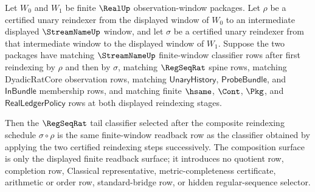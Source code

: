\begin{theorem}
\label{thm:regseqrat-tail-classifier-reindexing-composition}
Let $W_0$ and $W_1$ be finite $\RealUp$ observation-window packages. Let
$\rho$ be a certified unary reindexer from the displayed window of $W_0$ to an
intermediate displayed $\StreamNameUp$ window, and let $\sigma$ be a certified
unary reindexer from that intermediate window to the displayed window of
$W_1$. Suppose the two packages have matching $\StreamNameUp$ finite-window
classifier rows after first reindexing by $\rho$ and then by $\sigma$, matching
$\RegSeqRat$ spine rows, matching DyadicRatCore observation rows, matching
$\mathsf{UnaryHistory}$, $\mathsf{ProbeBundle}$, and $\mathsf{InBundle}$
membership rows, and matching finite $\hsame$, $\Cont$, $\Pkg$, and
$\mathsf{RealLedgerPolicy}$ rows at both displayed reindexing stages.

Then the $\RegSeqRat$ tail classifier selected after the composite
reindexing schedule $\sigma \circ \rho$ is the same finite-window readback row
as the classifier obtained by applying the two certified reindexing steps
successively. The composition surface is only the displayed finite readback
surface; it introduces no quotient row, completion row, Classical
representative, metric-completeness certificate, arithmetic or order row,
standard-bridge row, or hidden regular-sequence selector.
\end{theorem}
